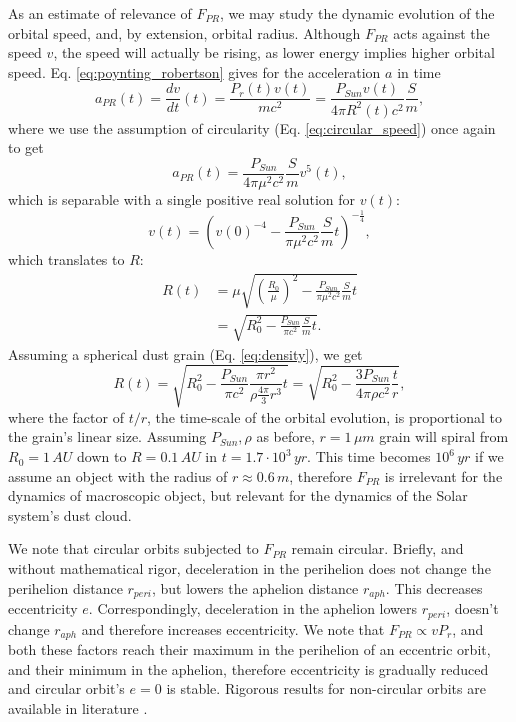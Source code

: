 As an estimate of relevance of $F_{PR}$, we may study the dynamic evolution of the orbital speed, and, by extension, orbital radius. Although $F_{PR}$ acts against the speed $v$, the speed will actually be rising, as lower energy implies higher orbital speed. Eq. \ref{eq:poynting_robertson} gives for the acceleration $a$ in time
\begin{equation}
    a_{PR}(t) = \frac{dv}{dt}(t) = \frac{P_{r}(t)v(t)}{mc^2} = \frac{P_{Sun} v(t) }{4 \pi R^2(t) c^2} \frac{S}{m},
\end{equation}
where we use the assumption of circularity (Eq. \ref{eq:circular_speed}) once again to get
\begin{equation}
    a_{PR}(t) = \frac{P_{Sun}}{4 \pi \mu^2 c^2} \frac{S}{m} v^5(t),
\end{equation}
which is separable with a single positive real solution for $v(t)$:
\begin{equation}
    v(t) = \left( v(0)^{-4} - \frac{P_{Sun}}{\pi \mu^2 c^2} \frac{S}{m} t \right)^{-\frac{1}{4}},
\end{equation}
which translates to $R$:
\begin{equation}\begin{split}
    R(t) &=  \mu \sqrt{ \left(\frac{R_0}{\mu}\right)^{2} - \frac{P_{Sun}}{\pi \mu^2 c^2} \frac{S}{m} t }
    \\ &= \sqrt{R_0^2 - \frac{P_{Sun}}{\pi c^2} \frac{S}{m} t }.
\end{split}\end{equation}
Assuming a spherical dust grain (Eq. \ref{eq:density}), we get
\begin{equation}
    R(t) = \sqrt{R_0^2 - \frac{P_{Sun}}{\pi c^2} \frac{\pi r^2}{\rho \frac{4\pi}{3} r^3} t } = \sqrt{R_0^2 - \frac{3P_{Sun}}{4 \pi \rho c^2} \frac{t}{r} },
    \label{eq:PR_estimate}
\end{equation}
where the factor of $t/r$, the time-scale of the orbital evolution, is proportional to the grain's linear size. Assuming $P_{Sun},\rho$ as before, $r=1\,\si{\mu m}$ grain will spiral from $R_0=1\,\si{AU}$ down to $R=0.1\,\si{AU}$ in $t=1.7 \cdot 10^3\,\si{yr}$. This time becomes $10^6\,\si{yr}$ if we assume an object with the radius of $r \approx 0.6 \, \si{m}$, therefore $F_{PR}$ is irrelevant for the dynamics of macroscopic object, but relevant for the dynamics of the Solar system's dust cloud. 

We note that circular orbits subjected to $F_{PR}$ remain circular. Briefly, and without mathematical rigor, deceleration in the perihelion does not change the perihelion distance $r_{peri}$, but lowers the aphelion distance $r_{aph}$. This decreases eccentricity $e$. Correspondingly, deceleration in the aphelion lowers $r_{peri}$, doesn't change $r_{aph}$ and therefore increases eccentricity. We note that $F_{PR} \propto v P_r$, and both these factors reach their maximum in the perihelion of an eccentric orbit, and their minimum in the aphelion, therefore eccentricity is gradually reduced and circular orbit's $e=0$ is stable. Rigorous results for non-circular orbits are available in literature \citep{wyatt1950poynting}. 

